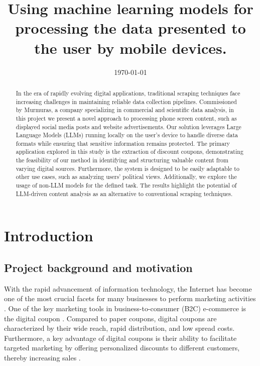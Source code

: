 \documentclass[licencjacka,en]{pracamgr}
\title{Using machine learning models for processing the data presented to the user by mobile devices.}
\date{\today}
\begin{document}
\maketitle

\begin{abstract}
In the era of rapidly evolving digital applications, traditional scraping techniques face increasing challenges in maintaining reliable data collection pipelines. Commissioned by Murmuras, a company specializing in commercial and scientific data analysis, in this project we present a novel approach to processing phone screen content, such as displayed social media posts and website advertisements. Our solution leverages Large Language Models (LLMs) running locally on the user's device to handle diverse data formats while ensuring that sensitive information remains protected. The primary application explored in this study is the extraction of discount coupons, demonstrating the feasibility of our method in identifying and structuring valuable content from varying digital sources. Furthermore, the system is designed to be easily adaptable to other use cases, such as analyzing users' political views. Additionally, we explore the usage of non-LLM models for the defined task. The results highlight the potential of LLM-driven content analysis as an alternative to conventional scraping techniques.
\raggedright
\end{abstract}

\tableofcontents
\listoffigures
\listoftables
\listofalgorithms

\chapter{Introduction}

\section{Project background and motivation}
With the rapid advancement of information technology, the Internet has become one of the most crucial facets for many businesses to perform marketing activities \cite{design_of_coupons}. One of the key marketing tools in business-to-consumer (B2C) e-commerce is the digital coupon \cite{targeted_reminders}. Compared to paper coupons, digital coupons are characterized by their wide reach, rapid distribution, and low spread costs. Furthermore, a key advantage of digital coupons is their ability to facilitate targeted marketing by offering personalized discounts to different customers, thereby increasing sales \cite{design_of_coupons}.
\end{document}
